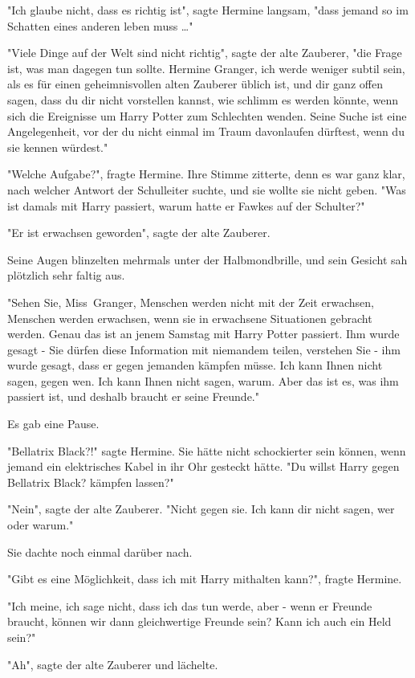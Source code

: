 {"Ich glaube nicht, dass es richtig ist", sagte Hermine langsam, "dass jemand so im Schatten eines anderen leben muss …"

"Viele Dinge auf der Welt sind nicht richtig", sagte der alte Zauberer, "die Frage ist, was man dagegen tun sollte. Hermine Granger, ich werde weniger subtil sein, als es für einen geheimnisvollen alten Zauberer üblich ist, und dir ganz offen sagen, dass du dir nicht vorstellen kannst, wie schlimm es werden könnte, wenn sich die Ereignisse um Harry Potter zum Schlechten wenden. Seine Suche ist eine Angelegenheit, vor der du nicht einmal im Traum davonlaufen dürftest, wenn du sie kennen würdest."

"Welche Aufgabe?", fragte Hermine. Ihre Stimme zitterte, denn es war ganz klar, nach welcher Antwort der Schulleiter suchte, und sie wollte sie nicht geben. "Was ist damals mit Harry passiert, warum hatte er Fawkes auf der Schulter?"

"Er ist erwachsen geworden", sagte der alte Zauberer.

Seine Augen blinzelten mehrmals unter der Halbmondbrille, und sein Gesicht sah plötzlich sehr faltig aus.

"Sehen Sie, Miss~Granger, Menschen werden nicht mit der Zeit erwachsen, Menschen werden erwachsen, wenn sie in erwachsene Situationen gebracht werden. Genau das ist an jenem Samstag mit Harry Potter passiert. Ihm wurde gesagt - Sie dürfen diese Information mit niemandem teilen, verstehen Sie - ihm wurde gesagt, dass er gegen jemanden kämpfen müsse. Ich kann Ihnen nicht sagen, gegen wen. Ich kann Ihnen nicht sagen, warum. Aber das ist es, was ihm passiert ist, und deshalb braucht er seine Freunde."

Es gab eine Pause.

"Bellatrix Black?!" sagte Hermine. Sie hätte nicht schockierter sein können, wenn jemand ein elektrisches Kabel in ihr Ohr gesteckt hätte. "Du willst Harry gegen Bellatrix Black? kämpfen lassen?"

"Nein", sagte der alte Zauberer. "Nicht gegen sie. Ich kann dir nicht sagen, wer oder warum."

Sie dachte noch einmal darüber nach.

"Gibt es eine Möglichkeit, dass ich mit Harry mithalten kann?", fragte Hermine.

"Ich meine, ich sage nicht, dass ich das tun werde, aber - wenn er Freunde braucht, können wir dann gleichwertige Freunde sein? Kann ich auch ein Held sein?"

"Ah", sagte der alte Zauberer und lächelte.

}
